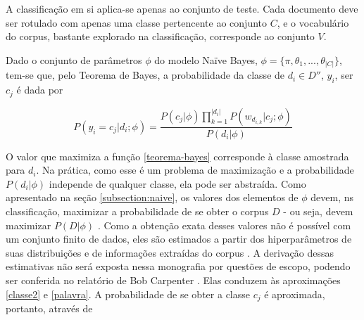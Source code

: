  A classificação em si aplica-se apenas ao conjunto de teste. Cada documento deve ser rotulado com apenas uma classe pertencente ao conjunto \ensuremath{C}, e o vocabulário do corpus, bastante explorado na classificação, corresponde ao conjunto \ensuremath{V}. %

Dado o conjunto de parâmetros \ensuremath{\phi} do modelo Naïve Bayes, \ensuremath{\phi = \{\pi, \theta_1, ..., \theta_{|C|}\}}, tem-se que, pelo Teorema de Bayes, a probabilidade da classe de \ensuremath{d_i \in D''}, \ensuremath{y_i}, ser \ensuremath{c_j} é dada por

\begin{equation}
\label{teorema-bayes}
\ensuremath{P(y_i = c_j | d_i ; \phi) = \frac{P(c_j | \phi)\prod_{k = 1}^{|d_i|}P(w_{d_{i,k}} | c_j; \phi)}{P(d_i | \phi)}}
\end{equation}

O valor que maximiza a função \ref{teorema-bayes} corresponde à classe amostrada para \ensuremath{d_i}. Na prática, como esse é um problema de maximização e a probabilidade \ensuremath{P(d_i | \phi)} independe de qualquer classe, ela pode ser abstraída. Como apresentado na seção \ref{subsection:naive}, os valores dos elementos de \ensuremath{\phi} devem, ns classificação, maximizar a probabilidade de se obter o corpus \ensuremath{D} - ou seja, devem maximizar \ensuremath{P(D | \phi)} \cite{nigam}. Como a obtenção exata desses valores não é possível com um conjunto finito de dados, eles são estimados a partir dos hiperparâmetros de suas distribuições e de informações extraídas do corpus \cite{nigam}. A derivação dessas estimativas não será exposta nessa monografia por questões de escopo, podendo ser conferida no relatório de Bob Carpenter \cite{gibbs-lingpipe}. Elas conduzem às aproximações \ref{classe2} e \ref{palavra}. A probabilidade de se obter a classe \ensuremath{c_j} é aproximada, portanto, através de 


